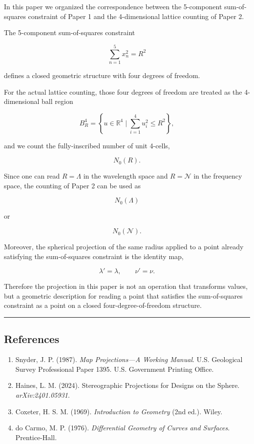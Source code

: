 \documentclass[
]{article}
\begin{document}
In this paper we organized the correspondence between the 5-component
sum-of-squares constraint of Paper 1 and the 4-dimensional lattice
counting of Paper 2.

The 5-component sum-of-squares constraint

\[
\sum_{n=1}^{5}x_n^2=R^2
\]

defines a closed geometric structure with four degrees of freedom.

For the actual lattice counting, those four degrees of freedom are
treated as the 4-dimensional ball region

\[
B^4_R
=
\left\{
u\in\mathbb{R}^4
\mid
\sum_{i=1}^{4}u_i^2\le R^2
\right\} ,
\]

and we count the fully-inscribed number of unit 4-cells,

\[
N_0(R) .
\]

Since one can read \(R=\Lambda\) in the wavelength space and
\(R=\mathcal{N}\) in the frequency space, the counting of Paper 2 can be
used as

\[
N_0(\Lambda)
\]

or

\[
N_0(\mathcal{N}) .
\]

Moreover, the spherical projection of the same radius applied to a point
already satisfying the sum-of-squares constraint is the identity map,

\[
\lambda'=\lambda,\qquad
\nu'=\nu .
\]

Therefore the projection in this paper is not an operation that
transforms values, but a geometric description for reading a point that
satisfies the sum-of-squares constraint as a point on a closed
four-degree-of-freedom structure.

\begin{center}\rule{0.5\linewidth}{0.5pt}\end{center}

\subsection{References}\label{references}

\begin{enumerate}
\def\labelenumi{\arabic{enumi}.}
\item
  Snyder, J. P. (1987). \emph{Map Projections---A Working Manual}. U.S.
  Geological Survey Professional Paper 1395. U.S. Government Printing
  Office.
\item
  Haines, L. M. (2024). Stereographic Projections for Designs on the
  Sphere. \emph{arXiv:2401.05931}.
\item
  Coxeter, H. S. M. (1969). \emph{Introduction to Geometry} (2nd ed.).
  Wiley.
\item
  do Carmo, M. P. (1976). \emph{Differential Geometry of Curves and
  Surfaces}. Prentice-Hall.
\end{enumerate}
\end{document}
